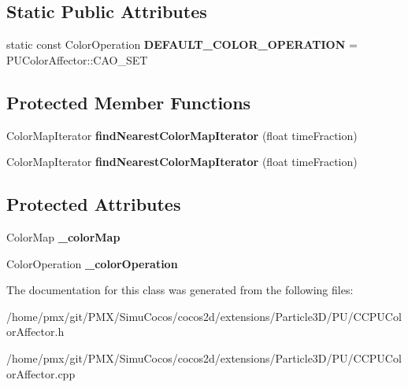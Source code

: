 \subsection*{Static Public Attributes}
\begin{DoxyCompactItemize}
\item 
\mbox{\label{classPUColorAffector_afc8e1aa43a9d4336e41fcfeaede7dcdf}} 
static const Color\+Operation {\bfseries D\+E\+F\+A\+U\+L\+T\+\_\+\+C\+O\+L\+O\+R\+\_\+\+O\+P\+E\+R\+A\+T\+I\+ON} = P\+U\+Color\+Affector\+::\+C\+A\+O\+\_\+\+S\+ET
\end{DoxyCompactItemize}
\subsection*{Protected Member Functions}
\begin{DoxyCompactItemize}
\item 
\mbox{\label{classPUColorAffector_a181daffe9b9d3ba9342f81285f7f676a}} 
Color\+Map\+Iterator {\bfseries find\+Nearest\+Color\+Map\+Iterator} (float time\+Fraction)
\item 
\mbox{\label{classPUColorAffector_ac636e33642028ba32c3f6a9766ae0924}} 
Color\+Map\+Iterator {\bfseries find\+Nearest\+Color\+Map\+Iterator} (float time\+Fraction)
\end{DoxyCompactItemize}
\subsection*{Protected Attributes}
\begin{DoxyCompactItemize}
\item 
\mbox{\label{classPUColorAffector_aaf88b152e11565273100be4b878ecfff}} 
Color\+Map {\bfseries \+\_\+color\+Map}
\item 
\mbox{\label{classPUColorAffector_af8e3910bfe67764d8f9efd56312548fa}} 
Color\+Operation {\bfseries \+\_\+color\+Operation}
\end{DoxyCompactItemize}


The documentation for this class was generated from the following files\+:\begin{DoxyCompactItemize}
\item 
/home/pmx/git/\+P\+M\+X/\+Simu\+Cocos/cocos2d/extensions/\+Particle3\+D/\+P\+U/C\+C\+P\+U\+Color\+Affector.\+h\item 
/home/pmx/git/\+P\+M\+X/\+Simu\+Cocos/cocos2d/extensions/\+Particle3\+D/\+P\+U/C\+C\+P\+U\+Color\+Affector.\+cpp\end{DoxyCompactItemize}
